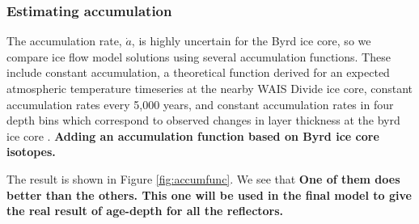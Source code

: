 \subsubsection{Estimating accumulation}\label{accum}
The accumulation rate, $\dot{a}$, is highly uncertain for the Byrd ice core, so we compare ice flow model solutions using several accumulation functions. These include constant accumulation, a theoretical function derived for an expected atmospheric temperature timeseries at the nearby WAIS Divide ice core\citet{morse2002}, constant accumulation rates every 5,000 years, and constant accumulation rates in four depth bins which correspond to observed changes in layer thickness at the byrd ice core \citep{}. \textbf{Adding an accumulation function based on Byrd ice core isotopes.}

The result is shown in Figure \ref{fig:accumfunc}. We see that \textbf{One of them does better than the others. This one will be used in the final model to give the real result of age-depth for all the reflectors.}


